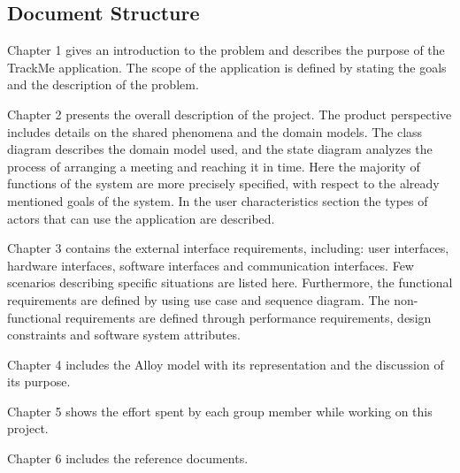 \subsection{Document Structure}
Chapter 1 gives an introduction to the problem and describes the purpose of the TrackMe application. The scope of the application is defined by stating the goals and the description of the problem.\newline

Chapter 2 presents the overall description of the project. The product perspective includes details on
the shared phenomena and the domain models. The class diagram describes the domain model used,
and the state diagram analyzes the process of arranging a meeting and reaching it in time. Here the
majority of functions of the system are more precisely specified, with respect to the already mentioned
goals of the system. In the user characteristics section the types of actors that can use the application
are described.\newline

Chapter 3 contains the external interface requirements, including: user interfaces, hardware interfaces,
software interfaces and communication interfaces. Few scenarios describing specific situations are listed
here. Furthermore, the functional requirements are defined by using use case and sequence diagram.
The non-functional requirements are defined through performance requirements, design constraints
and software system attributes.\newline

Chapter 4 includes the Alloy model with its representation and the discussion of its purpose.\newline

Chapter 5 shows the effort spent by each group member while working on this project.\newline

Chapter 6 includes the reference documents.

%